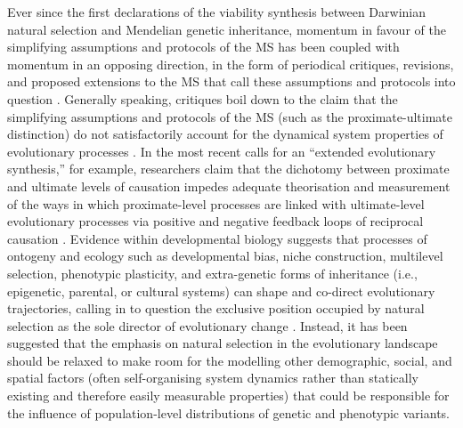 Ever since the first declarations of the viability synthesis between Darwinian natural selection and Mendelian genetic inheritance, momentum in favour of the simplifying assumptions and protocols of the MS has been coupled with momentum in an opposing direction, in the form of periodical critiques, revisions, and proposed extensions to the MS that call these assumptions and protocols into question \citep[see, for example][]{Waddington1950,Gould1980,Ingold1990,Ingold1995,Odling-Schmee2003,Piggliuci2007}. Generally speaking, critiques boil down to the claim that the simplifying assumptions and protocols of the MS (such as the proximate-ultimate distinction) do not satisfactorily account for the dynamical system properties of evolutionary processes \citep{Svensson2017}. In the most recent calls for an ``extended evolutionary synthesis,'' for example, researchers claim that the dichotomy between proximate and ultimate levels of causation impedes adequate theorisation and measurement of the ways in which proximate-level processes are linked with ultimate-level evolutionary processes via positive and negative feedback loops of reciprocal causation \citep{Pigliucci2007,Laland2011,Laland2013,Mesoudi2013,Laland2015}. Evidence within developmental biology suggests that processes of ontogeny and ecology such as developmental bias, niche construction, multilevel selection, phenotypic plasticity, and extra-genetic forms of inheritance (i.e., epigenetic, parental, or cultural systems) can shape and co-direct evolutionary trajectories, calling in to question the exclusive position occupied by natural selection as the sole director of evolutionary change \citep{Laland2013}.  Instead, it has been suggested that the emphasis on natural selection in the evolutionary landscape should be relaxed to make room for the modelling other demographic, social, and spatial factors (often self-organising system dynamics rather than statically existing and therefore easily measurable properties) that could be responsible for the influence of population-level distributions of genetic and phenotypic variants.

